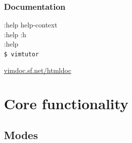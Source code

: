 \documentclass[14pt,svgnames,compress]{beamer}
\newcommand\frametitlefontsize{\Huge}
\newcommand\framesubtitlefontsize{\huge}
\newcommand\singleframetitle[1]{
    \begin{center}
        \frametitlefontsize #1
    \end{center}
}
\newcommand\singleframesubtitle[1]{
    \begin{center}
        \framesubtitlefontsize #1
    \end{center}
}
\newcommand\titleframe{
    \begin{frame}
        \singleframetitle{\insertsectionhead}
    \end{frame}
}
\newcommand\subtitleframe{
    \begin{frame}
        \singleframesubtitle{\insertsubsectionhead}
    \end{frame}
}
\begin{document}
\begin{frame}[fragile]
    \frametitle{Documentation}
    \vspace{1cm}
    \Large
    :help help-context \\ \bigskip
    :help :h           \\ \bigskip
    :help              \\ \bigskip
    \verb|$ vimtutor|  \\
    \begin{center}
        \href{http://vimdoc.sourceforge.net/htmldoc}
             {vimdoc.sf.net/htmldoc}
    \end{center}
\end{frame}


\section{Core functionality}

\titleframe

\begin{frame}[plain]
\end{frame}


\subsection{Modes}

\subtitleframe
\end{document}
